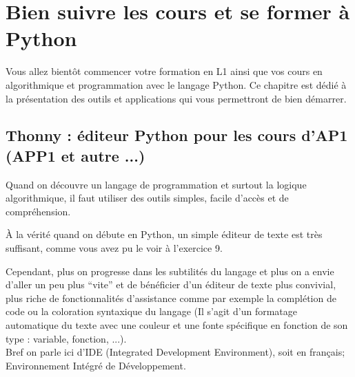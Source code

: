 \documentclass{article}
\begin{document}
\maketitle


\section {Bien suivre les cours et se former à Python}

Vous allez bientôt commencer votre formation en L1 ainsi que vos cours en algorithmique et programmation avec le langage Python. Ce chapitre est dédié à la présentation des outils et applications qui vous permettront de bien démarrer.

\subsection{Thonny : éditeur Python pour les cours d'AP1 (APP1 et autre ...)}

Quand on découvre un langage de programmation et surtout la logique algorithmique, il faut utiliser des outils simples, facile d'accès et de compréhension.

À la vérité quand on débute en Python, un simple éditeur de texte est très suffisant, comme vous avez pu le voir à l'exercice 9. 

Cependant, plus on progresse dans les subtilités du langage et plus on a envie d'aller un peu plus ``vite'' et de bénéficier d'un éditeur de texte plus convivial, plus riche de fonctionnalités d'assistance comme par exemple la complétion de code ou la coloration syntaxique du langage (Il s'agit d'un formatage automatique du texte avec une couleur et une fonte spécifique en fonction de son type : variable, fonction, ...). \\
Bref on parle ici d'IDE (Integrated Development Environment), soit en fran\c cais; Environnement Intégré de Développement.
\end{document}
